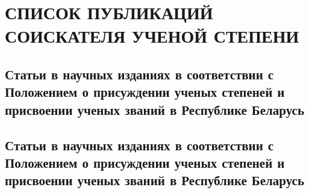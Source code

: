 \documentclass[_00_autoref.tex]{subfiles}
\begin{document}
\chapter*{\MakeUppercase{Список публикаций соискателя ученой степени}}

\vspace{-4ex}
\section*{\fontsize{14}{15}\selectfont Статьи в научных изданиях в соответствии с Положением о присуждении ученых степеней и присвоении ученых званий в Республике Беларусь}
\vspace{-4ex}

\renewcommand{\labelenumi}{\arabic{enumi}--A}
\renewcommand{\theenumi}{\arabic{enumi}--A}

\vspace{-4ex}
\section*{\fontsize{14}{15}\selectfont Статьи в научных изданиях в соответствии с Положением о присуждении ученых степеней и присвоении ученых званий в Республике Беларусь}
\vspace{-4ex}
\end{document}
